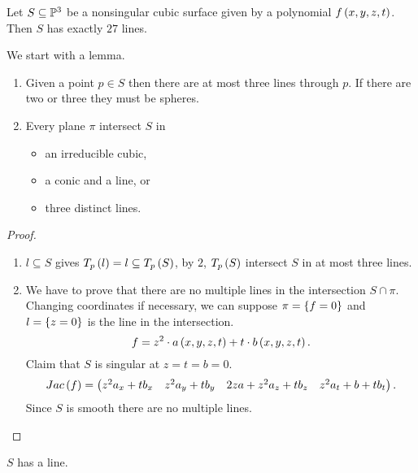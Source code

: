 
\begin{theorem}
Let $ S \subseteq \P^3 $ be a nonsingular cubic surface given by a polynomial $ f\br{x, y, z, t} $. Then $ S $ has exactly $ 27 $ lines.
\end{theorem}

We start with a lemma.

\begin{lemma}
\hfill
\begin{enumerate}
\item Given a point $ p \in S $ then there are at most three lines through $ p $. If there are two or three they must be spheres.
\item Every plane $ \pi $ intersect $ S $ in
\begin{itemize}
\item an irreducible cubic,
\item a conic and a line, or
\item three distinct lines.
\end{itemize}
\end{enumerate}
\end{lemma}

\begin{proof}
\hfill
\begin{enumerate}
\item $ l \subseteq S $ gives $ T_p\br{l} = l \subseteq T_p\br{S} $, by $ 2 $, $ T_p\br{S} $ intersect $ S $ in at most three lines.
\item We have to prove that there are no multiple lines in the intersection $ S \cap \pi $. Changing coordinates if necessary, we can suppose $ \pi = \cbr{f = 0} $ and $ l = \cbr{z = 0} $ is the line in the intersection.
$$ f = z^2 \cdot a\br{x, y, z, t} + t \cdot b\br{x, y, z, t}. $$
Claim that $ S $ is singular at $ z = t = b = 0 $.
$$ Jac\br{f} = \onebytwo{z^2a_x + tb_x & z^2a_y + tb_y}{2za + z^2a_z + tb_z & z^2a_t + b + tb_t}. $$
Since $ S $ is smooth there are no multiple lines.
\end{enumerate}
\end{proof}

\begin{lemma}
$ S $ has a line.
\end{lemma}

